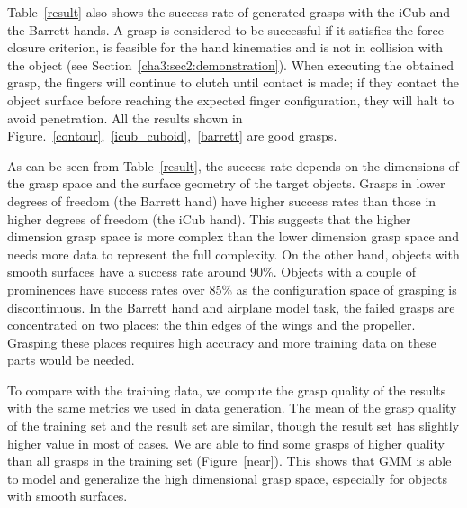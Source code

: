 Table~\ref{result} also shows the success rate of generated grasps with the iCub and the Barrett hands. A grasp is considered to be successful if it satisfies the force-closure criterion, is feasible for the hand kinematics and is not in collision with the object (see Section~\ref{cha3:sec2:demonstration}). When executing the obtained grasp, the fingers will continue to clutch until contact is made; if they contact the object surface before reaching the expected finger configuration, they will halt to avoid penetration.
All the results shown in Figure.~\ref{contour},~\ref{icub_cuboid},~\ref{barrett} are good grasps.

As can be seen from Table~\ref{result}, the success rate depends on the dimensions of the grasp space and the surface geometry of the target objects. Grasps in lower degrees of freedom (the Barrett hand) have higher success rates than those in higher degrees of freedom (the iCub hand). This suggests that the higher dimension grasp space is more complex than the lower dimension grasp space and needs more data to represent the full complexity. On the other hand, objects with smooth surfaces have a success rate around 90\%. Objects with a couple of prominences have success rates over 85\% as the configuration space of grasping is discontinuous. In the Barrett hand and airplane model task, the failed grasps are concentrated on two places: the thin edges of the wings and the propeller. Grasping these places requires high accuracy and more training data on these parts would be needed.

To compare with the training data, we compute the grasp quality of the results with the same metrics we used in data generation. The mean of the grasp quality of the training set and the result set are similar, though the result set has slightly higher value in most of cases. We are able to find some grasps of higher quality than all grasps in the training set (Figure~\ref{near}). This shows that GMM is able to model and generalize the high dimensional grasp space, especially for objects with smooth surfaces.




